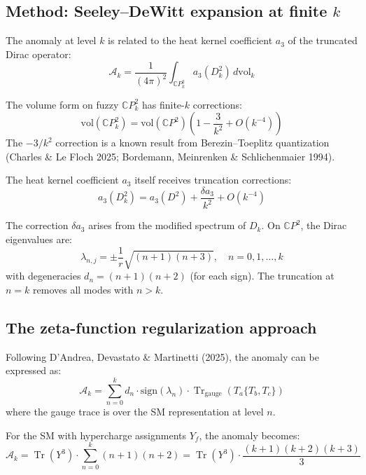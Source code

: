 \documentclass[11pt,a4paper]{article}
\newcommand{\Tr}{\operatorname{Tr}}
\newcommand{\CP}{\mathbb{C}P}
\begin{document}
\subsection{Method: Seeley--DeWitt expansion at finite $k$}

The anomaly at level $k$ is related to the heat kernel coefficient $a_3$ of the truncated Dirac operator:
\begin{equation}
\mathcal{A}_k = \frac{1}{(4\pi)^2} \int_{\CP^2_k} a_3(D_k^2) \, d\mathrm{vol}_k
\end{equation}

The volume form on fuzzy $\CP^2_k$ has finite-$k$ corrections:
\begin{equation}
\mathrm{vol}(\CP^2_k) = \mathrm{vol}(\CP^2) \left(1 - \frac{3}{k^2} + O(k^{-4})\right)
\end{equation}
The $-3/k^2$ correction is a known result from Berezin--Toeplitz quantization (Charles \& Le Floch 2025; Bordemann, Meinrenken \& Schlichenmaier 1994).

The heat kernel coefficient $a_3$ itself receives truncation corrections:
\begin{equation}
a_3(D_k^2) = a_3(D^2) + \frac{\delta a_3}{k^2} + O(k^{-4})
\end{equation}

The correction $\delta a_3$ arises from the modified spectrum of $D_k$. On $\CP^2$, the Dirac eigenvalues are:
\begin{equation}
\lambda_{n,j} = \pm \frac{1}{r}\sqrt{(n+1)(n+3)}, \quad n = 0, 1, \ldots, k
\end{equation}
with degeneracies $d_n = (n+1)(n+2)$ (for each sign). The truncation at $n = k$ removes all modes with $n > k$.

\subsection{The zeta-function regularization approach}

Following D'Andrea, Devastato \& Martinetti (2025), the anomaly can be expressed as:
\begin{equation}
\mathcal{A}_k = \sum_{n=0}^{k} d_n \cdot \mathrm{sign}(\lambda_n) \cdot \Tr_{\text{gauge}}(T_a \{T_b, T_c\})
\end{equation}
where the gauge trace is over the SM representation at level $n$.

For the SM with hypercharge assignments $Y_f$, the anomaly becomes:
\begin{equation}
\mathcal{A}_k = \Tr(Y^3) \cdot \sum_{n=0}^{k} (n+1)(n+2) = \Tr(Y^3) \cdot \frac{(k+1)(k+2)(k+3)}{3}
\end{equation}
\end{document}
